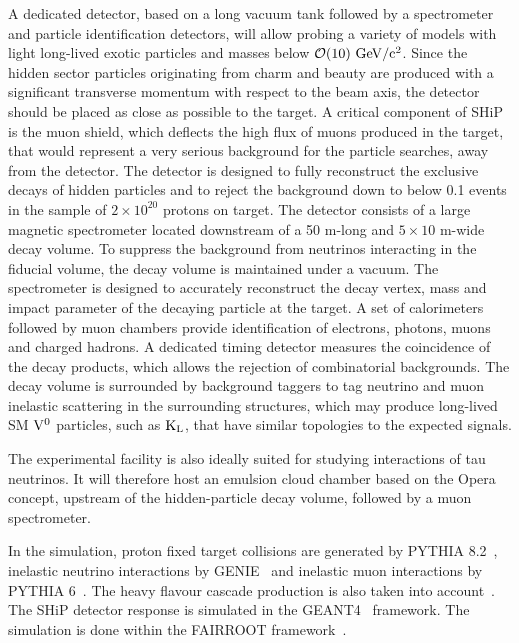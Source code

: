 \documentclass[12pt,a4paper]{article}
\begin{document}
A dedicated detector, based on a long vacuum tank followed by a
spectrometer and particle identification detectors, will allow probing
a variety of models with light long-lived exotic particles and masses
below $\mathcal O(10)~\rm{GeV/c^2}$.  Since the hidden sector
particles originating from charm and beauty are produced with a
significant transverse momentum with respect to the beam axis, the
detector should be placed as close as possible to the target.  A
critical component of SHiP is the muon shield, which deflects the high
flux of muons produced in the target, that would represent a very
serious background for the particle searches, away from the
detector. The detector is designed to fully reconstruct the exclusive
decays of hidden particles and to reject the background down to below
0.1 events in the sample of $2\times 10^{20}$ protons on target.  The
detector consists of a large magnetic spectrometer located downstream
of a 50 m-long and $5\times 10$ m-wide decay volume. To suppress the
background from neutrinos interacting in the fiducial volume, the
decay volume is maintained under a vacuum.  The spectrometer is
designed to accurately reconstruct the decay vertex, mass and impact
parameter
of the decaying particle at 
the target. A set of calorimeters 
followed by muon 
chambers provide identification of electrons, photons, muons and charged hadrons. 
A dedicated 
 timing detector measures the coincidence of the decay products, which
allows the rejection of combinatorial backgrounds.  The decay volume
is surrounded by background taggers to tag neutrino and muon inelastic
scattering in the surrounding structures, which may produce long-lived
SM $\rm{V}^0$ particles, such as $\rm{K}_{\rm{L}}$, that have similar
topologies to the expected signals.


The experimental facility is also ideally suited for studying
interactions of tau neutrinos.  It will therefore host an emulsion
cloud chamber based on the Opera concept, upstream of the
hidden-particle decay volume, followed by a muon spectrometer.


In the simulation, proton fixed target collisions are generated by
PYTHIA 8.2~\cite{Sjostrand:2014zea}, inelastic neutrino interactions by
GENIE~\cite{Genie} and inelastic muon interactions by
PYTHIA 6~\cite{pythia6}. The heavy flavour cascade production is also
taken into account~\cite{CERN-SHiP-NOTE-2015-009}.  The SHiP detector response is
simulated in the GEANT4~\cite{Geant4} framework. The simulation is
done within the FAIRROOT framework~\cite{FAIRROOT}.
\end{document}
